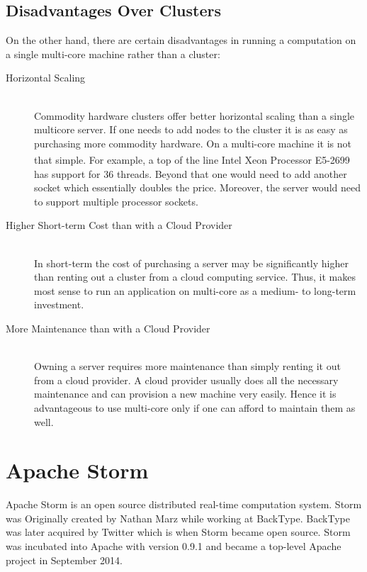 \documentclass[bsc,logo,frontabs,twoside,singlespacing,normalheadings,parskip]{infthesis}\usepackage[]{graphicx}\usepackage[]{color}
\begin{document}
\subsection{Disadvantages Over Clusters}
\label{subsec:disadvantages}

On the other hand, there are certain disadvantages in running a computation on a single multi-core machine rather than a cluster:

\begin{description}
	\item[Horizontal Scaling] \hfill \\
	Commodity hardware clusters offer better horizontal scaling than a single multicore server. If one needs to add nodes to the cluster it is as easy as purchasing more commodity hardware. On a multi-core machine it is not that simple. For example, a top of the line Intel\textsuperscript{\textregistered} Xeon\textsuperscript{\textregistered} Processor E5-2699 has support for 36 threads. Beyond that one would need to add another socket which essentially doubles the price. Moreover, the server would need to support multiple processor sockets.
	\item[Higher Short-term Cost than with a Cloud Provider] \hfill \\
	In short-term the cost of purchasing a server may be significantly higher than renting out a cluster from a cloud computing service. Thus, it makes most sense to run an application on multi-core as a medium- to long-term investment.
	\item[More Maintenance than with a Cloud Provider] \hfill \\
	Owning a server requires more maintenance than simply renting it out from a cloud provider. A cloud provider usually does  all the necessary maintenance and can provision a new machine very easily. Hence it is advantageous to use multi-core only if one can afford to maintain them as well.
\end{description}


\section{Apache Storm}
\label{sec:apache_storm}

Apache Storm is an open source distributed real-time computation system. Storm was Originally created by Nathan Marz while working at BackType. \cite{NathanAbout} BackType was later acquired by Twitter which is when Storm became open source. Storm was incubated into Apache with version 0.9.1 and became a top-level Apache project in September 2014.
\end{document}
